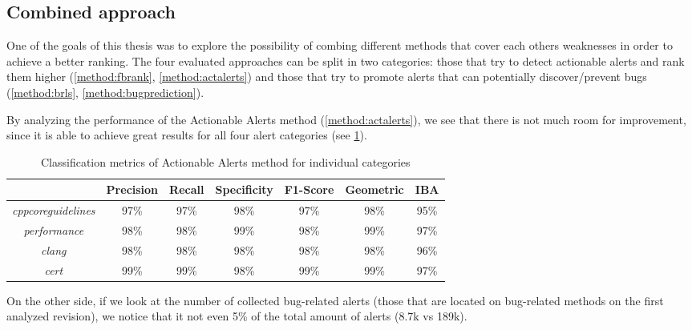 \subsection{Combined approach}
\label{results:ensemble_approach}
One of the goals of this thesis was to explore the possibility of combing different methods that cover each others weaknesses in order to achieve a better ranking. The four evaluated approaches can be split in two categories: those that try to detect actionable alerts and rank them higher (\cref{method:fbrank}, \cref{method:actalerts}) and those that try to promote alerts that can potentially discover/prevent bugs (\cref{method:brls}, \cref{method:bugprediction}).

By analyzing the performance of the Actionable Alerts method (\cref{method:actalerts}), we see that there is not much room for improvement, since it is able to achieve great results for all four alert categories (see \cref{results:individual_categories}).

\begin{table}[H]
	\centering
	\caption{Classification metrics of Actionable Alerts method for individual categories}
	\label{results:individual_categories}
	\begin{tabular}{@{}ccccccc@{}}
		\toprule
		& \textbf{Precision} & \textbf{Recall} & \textbf{Specificity} & \textbf{F1-Score} & \textbf{Geometric} & \textbf{IBA} \\ \midrule
		\textit{cppcoreguidelines} & 97\%               & 97\%            & 98\%                 & 97\%              & 98\%               & 95\%         \\
		\textit{performance}       & 98\%               & 98\%            & 99\%                 & 98\%              & 99\%               & 97\%         \\
		\textit{clang}             & 98\%               & 98\%            & 98\%                 & 98\%              & 98\%               & 96\%         \\
		\textit{cert}              & 99\%               & 99\%            & 98\%                 & 99\%              & 99\%               & 97\%         \\ \bottomrule
	\end{tabular}
\end{table}


On the other side, if we look at the number of collected bug-related alerts (those that are located on bug-related methods on the first analyzed revision), we notice that it not even 5\% of the total amount of alerts (8.7k vs 189k). 

